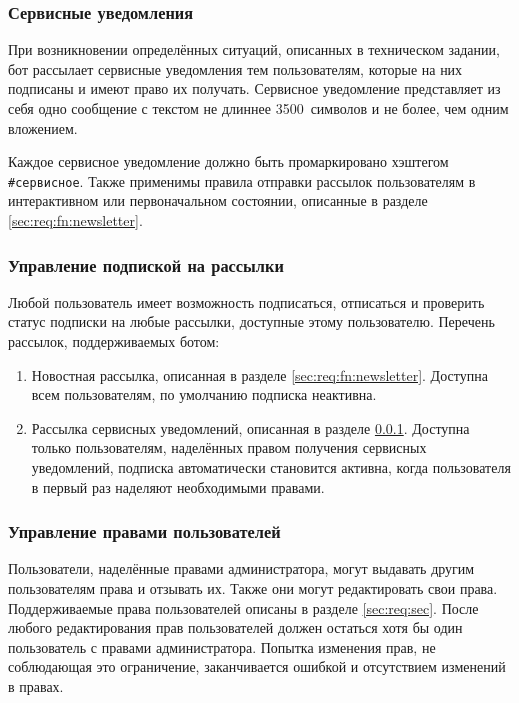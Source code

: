     \subsubsection{Сервисные уведомления}
        \label{sec:req:fn:service}
        При возникновении определённых ситуаций, описанных в техническом задании,
        бот рассылает сервисные уведомления тем пользователям, которые на них подписаны и имеют
        право их получать. Сервисное уведомление представляет из себя одно сообщение с текстом
        не длиннее 3500~символов и не более, чем одним вложением.

        Каждое сервисное уведомление должно быть промаркировано хэштегом \hbox{\texttt{\#сервисное}}.
        Также применимы правила отправки рассылок пользователям в интерактивном или первоначальном состоянии,
        описанные в разделе \ref{sec:req:fn:newsletter}.

    \subsubsection{Управление подпиской на рассылки}
        \label{sec:req:fn:subscriptions}
        Любой пользователь имеет возможность подписаться, отписаться и проверить статус подписки на
        любые рассылки, доступные этому пользователю. Перечень рассылок, поддерживаемых ботом:
        \begin{enumerate}
            \item
                Новостная рассылка, описанная в разделе \ref{sec:req:fn:newsletter}.
                Доступна всем пользователям, по умолчанию подписка неактивна.
            \item
                Рассылка сервисных уведомлений, описанная в разделе \ref{sec:req:fn:service}.
                Доступна только пользователям, наделённых правом получения сервисных уведомлений,
                подписка автоматически становится активна, когда пользователя в первый
                раз наделяют необходимыми правами.
        \end{enumerate}

    \subsubsection{Управление правами пользователей}
        \label{seq:req:fn:roles}
        Пользователи, наделённые правами администратора, могут выдавать другим
        пользователям права и отзывать их. Также они могут редактировать свои права.
        Поддерживаемые права пользователей описаны в разделе \ref{sec:req:sec}.
        После любого редактирования прав пользователей должен остаться хотя бы один
        пользователь с правами администратора. Попытка изменения прав, не соблюдающая
        это ограничение, заканчивается ошибкой и отсутствием изменений в правах.

